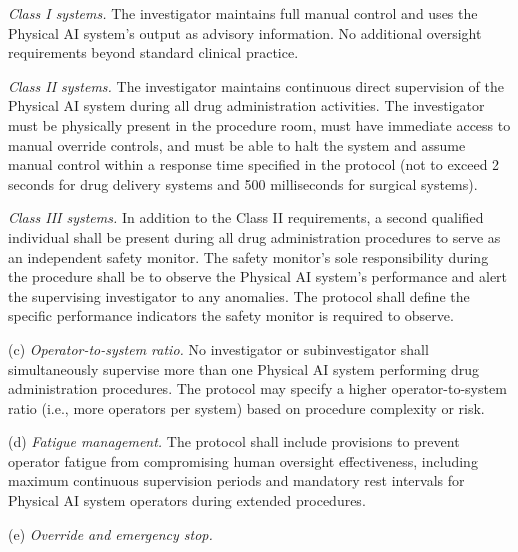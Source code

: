\begin{description}[leftmargin=0.8cm,style=sameline]
\item[(1)] \textit{Class I systems.} The investigator maintains full manual control and uses the Physical AI system's output as advisory information. No additional oversight requirements beyond standard clinical practice.
\item[(2)] \textit{Class II systems.} The investigator maintains continuous direct supervision of the Physical AI system during all drug administration activities. The investigator must be physically present in the procedure room, must have immediate access to manual override controls, and must be able to halt the system and assume manual control within a response time specified in the protocol (not to exceed 2 seconds for drug delivery systems and 500 milliseconds for surgical systems).
\item[(3)] \textit{Class III systems.} In addition to the Class II requirements, a second qualified individual shall be present during all drug administration procedures to serve as an independent safety monitor. The safety monitor's sole responsibility during the procedure shall be to observe the Physical AI system's performance and alert the supervising investigator to any anomalies. The protocol shall define the specific performance indicators the safety monitor is required to observe.
\end{description}

(c) \textit{Operator-to-system ratio.} No investigator or subinvestigator shall simultaneously supervise more than one Physical AI system performing drug administration procedures. The protocol may specify a higher operator-to-system ratio (i.e., more operators per system) based on procedure complexity or risk.

(d) \textit{Fatigue management.} The protocol shall include provisions to prevent operator fatigue from compromising human oversight effectiveness, including maximum continuous supervision periods and mandatory rest intervals for Physical AI system operators during extended procedures.

(e) \textit{Override and emergency stop.}

